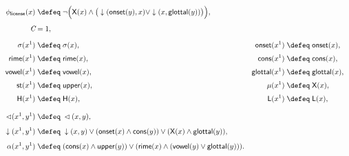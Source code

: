 \begin{align*}
	\phi_{\textsf{license}}(x) 
	&\;\defeq\;
	\lnot\Big(
	\mathsf{X}(x) \wedge
	\big(
	\downarrow(\mathsf{onset}(y),x)
	\vee
	\downarrow(x,\mathsf{glottal}(y))
	\big)
	\Big), \\[4pt]
	\textit{C} &= 1, \\[6pt]
	\sigma(x^1) &\;\defeq\; \sigma(x), &
	\mathsf{onset}(x^1) &\;\defeq\; \mathsf{onset}(x), \\[2pt]
	\mathsf{rime}(x^1) &\;\defeq\; \mathsf{rime}(x), &
	\mathsf{cons}(x^1) &\;\defeq\; \mathsf{cons}(x), \\[2pt]
	\mathsf{vowel}(x^1) &\;\defeq\; \mathsf{vowel}(x), &
	\mathsf{glottal}(x^1) &\;\defeq\; \mathsf{glottal}(x), \\[2pt]
	\mathsf{st}(x^1) &\;\defeq\; \mathsf{upper}(x), &
	\mathsf{\mu}(x^1) &\;\defeq\; \mathsf{X}(x), \\[2pt]
	\mathsf{H}(x^1) &\;\defeq\; \mathsf{H}(x), &
	\mathsf{L}(x^1) &\;\defeq\; \mathsf{L}(x), \\[8pt]
	\lhd(x^1,y^1) 
	&\;\defeq\; \lhd(x,y), \\[4pt]
	\downarrow(x^1,y^1)
	&\;\defeq\;
	\downarrow(x,y)
	\vee
	(\mathsf{onset}(x) \wedge \mathsf{cons}(y))
	\vee
	(\mathsf{X}(x) \wedge \mathsf{glottal}(y)), \\[4pt]
	\alpha(x^1,y^1)
	&\;\defeq\;
	(\mathsf{cons}(x) \wedge \mathsf{upper}(y))
	\vee
	(\mathsf{rime}(x) \wedge (\mathsf{vowel}(y) \vee \mathsf{glottal}(y))).
\end{align*}
